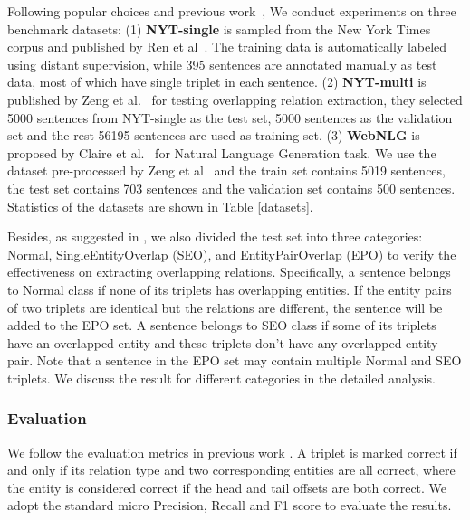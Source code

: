 \documentclass{ecai}
\begin{document}
Following popular choices and previous work~\cite{dai2019joint,fu-etal-2019-graphrel,ren2017cotype,zeng-etal-2019-learning,zeng2018extracting,zheng2017joint}, We conduct experiments on three benchmark datasets:
(1) \textbf{NYT-single} is sampled from the New York Times corpus \cite{riedel2010modeling} and published by Ren et al~\cite{ren2017cotype}. The training data is automatically labeled using distant supervision, while 395 sentences are annotated manually as test data, most of which have single triplet in each sentence. 
(2) \textbf{NYT-multi} is published by Zeng et al.~\cite{zeng2018extracting} for testing overlapping relation extraction, they selected  5000 sentences from NYT-single as the test set, 5000 sentences as the validation set and the rest 56195 sentences are used as training set. 
(3) \textbf{WebNLG} is proposed by Claire et al.~\cite{gardent2017creating} for Natural Language Generation task. We use the dataset pre-processed by Zeng et al~\cite{zeng2018extracting} and the train set contains 5019 sentences, the test set contains 703 sentences and the validation set contains 500 sentences. Statistics of the datasets are shown in Table \ref{datasets}. 

Besides, as suggested in \cite{fu-etal-2019-graphrel,zeng2018extracting}, we also divided the test set into three categories: Normal, SingleEntityOverlap (SEO), and EntityPairOverlap (EPO) to verify the effectiveness on extracting overlapping relations. 
Specifically, a sentence belongs to Normal class if none of its triplets has overlapping entities. 
If the entity pairs of two triplets are identical but the relations are different, the sentence will be added to the EPO set. 
A sentence belongs to SEO class if some of its triplets have an overlapped entity and these triplets don’t have any overlapped entity pair.
Note that a sentence in the EPO set may contain multiple Normal and SEO triplets.
We discuss the result for different categories in the detailed analysis.





\subsubsection{Evaluation}
We follow the evaluation metrics in previous work \cite{dai2019joint,fu-etal-2019-graphrel,ren2017cotype,zeng-etal-2019-learning,zeng2018extracting,zheng2017joint}.
A triplet is marked correct if and only if its relation type and two corresponding entities are all correct, where the entity is considered correct if the head and tail offsets are both correct. 
We adopt the standard micro Precision, Recall and F1 score to evaluate the results.
\end{document}
